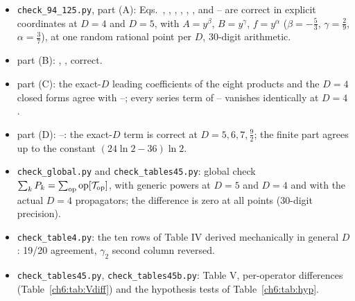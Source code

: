 \begin{itemize}[leftmargin=14pt]
\item[(A)] \texttt{check\_94\_125.py}, part (A): Eqs.~, , , , , ,  and -- are
correct in explicit coordinates at $D=4$ and $D=5$, with $A=y^\beta$, $B=y^\gamma$, $f=y^\alpha$ ($\beta=-\frac53$, $\gamma=\frac29$, $\alpha=\frac37$),
at one random rational point per $D$, 30-digit arithmetic.
\item[(B)] part (B): , ,  correct.
\item[(C)] part (C): the exact-$D$ leading coefficients of the eight products and the $D=4$ closed forms agree with --; every series
term of -- vanishes identically at $D=4$.
\item[(D)] part (D): --: the exact-$D$ term is correct at $D=5,6,7,\frac92$; the finite part agrees up to the constant
$(24\ln2-36)\ln2$.
\item[(F4)] \texttt{check\_global.py} and \texttt{check\_tables45.py}: global check $\sum_kP_k=\sum_{\rm op}\text{op}[\mathcal{T}_{\rm op}]$, with generic powers at
$D=5$ and $D=4$ and with the actual $D=4$ propagators; the difference is zero at all points (30-digit precision).
\item[(T4)] \texttt{check\_table4.py}: the ten rows of Table IV derived mechanically in general $D$: 19/20 agreement, $\gamma_2$ second column reversed.
\item[(T5)] \texttt{check\_tables45.py}, \texttt{check\_tables45b.py}: Table V, per-operator differences (Table~\ref{ch6:tab:Vdiff}) and the hypothesis tests
of Table~\ref{ch6:tab:hyp}.
\end{itemize}

